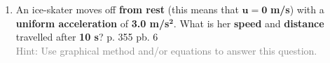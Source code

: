 \documentclass[A4,12pt]{article}
\begin{document}
\begin{enumerate}[label=\bfseries (\arabic*)]
\item An ice-skater moves off \textbf{from rest} (this means that $\bm{u = 0}$ \textbf{m/s}) with a \textbf{uniform acceleration} of \textbf{3.0 m/s}$\bm{^2}$. What is her \textbf{speed} and \textbf{distance} travelled after \textbf{10 s}? \cite{CCEADA} p. 355 pb. 6\\
\textcolor{gray}{Hint: Use graphical method and/or equations to answer this question.}



















\end{enumerate}
\end{document}
